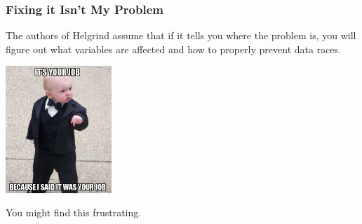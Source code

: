 \begin{frame}
	\frametitle{Fixing it Isn't My Problem}


	The authors of Helgrind assume that if it tells you where the problem is, you will figure out what variables are affected and how to properly prevent data races.

	\begin{center}
		\includegraphics[width=0.3\textwidth]{images/its-your-job.jpg}
	\end{center}

	You might find this frustrating.



\end{frame}



